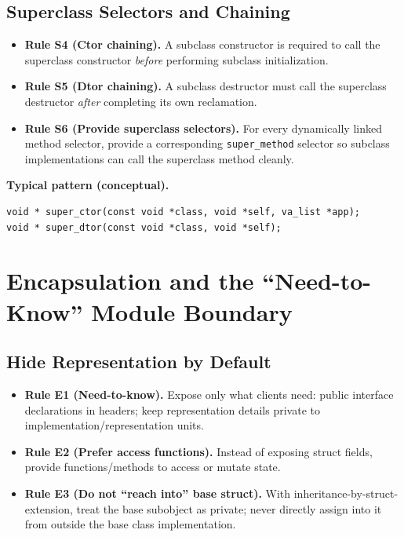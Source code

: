 \documentclass[11pt]{article}
\begin{document}
\subsection{Superclass Selectors and Chaining}

\begin{itemize}
  \item \textbf{Rule S4 (Ctor chaining).} A subclass constructor is required to call the superclass constructor \emph{before} performing subclass initialization.
  \item \textbf{Rule S5 (Dtor chaining).} A subclass destructor must call the superclass destructor \emph{after} completing its own reclamation.
  \item \textbf{Rule S6 (Provide superclass selectors).} For every dynamically linked method selector, provide a corresponding \texttt{super\_method} selector so subclass implementations can call the superclass method cleanly.
\end{itemize}

\noindent\textbf{Typical pattern (conceptual).}
\begin{verbatim}
void * super_ctor(const void *class, void *self, va_list *app);
void * super_dtor(const void *class, void *self);
\end{verbatim}

\section{Encapsulation and the ``Need-to-Know'' Module Boundary}

\subsection{Hide Representation by Default}

\begin{itemize}
  \item \textbf{Rule E1 (Need-to-know).} Expose only what clients need: public interface declarations in headers; keep representation details private to implementation/representation units.
  \item \textbf{Rule E2 (Prefer access functions).} Instead of exposing struct fields, provide functions/methods to access or mutate state.
  \item \textbf{Rule E3 (Do not ``reach into'' base struct).} With inheritance-by-struct-extension, treat the base subobject as private; never directly assign into it from outside the base class implementation.
\end{itemize}
\end{document}
